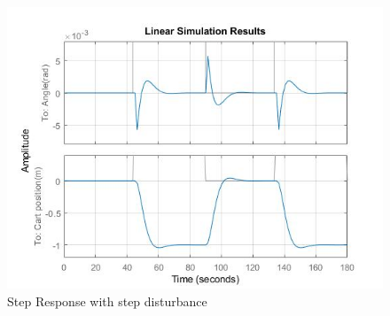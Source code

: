 \documentclass[a4paper]{article}
\begin{document}
\begin{figure}[!htb]
    \centering
    \includegraphics[scale = 0.6]{StepResponseDisturb_LQR.jpg}
    \caption{Step Response with step disturbance}
\end{figure}
\newpage
\end{document}
